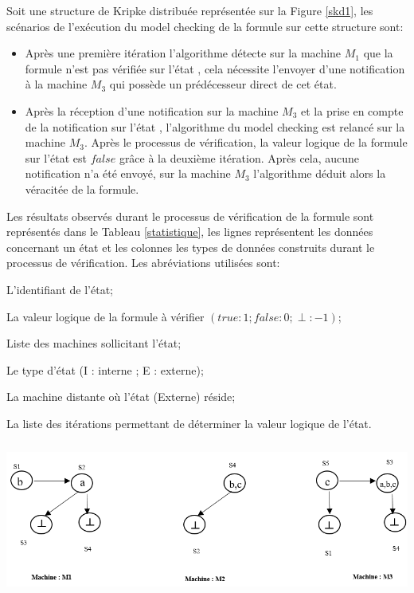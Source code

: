 \begin{Exemple}
   Soit une structure de Kripke distribuée représentée sur la Figure \ref{skd1}, les scénarios de l'exécution du model checking de la formule  sur cette structure sont:
   \begin{itemize}
   	\item Après une première itération l'algorithme détecte sur la machine $M_1$ que la formule n’est pas vérifiée sur l’état , cela nécessite l'envoyer d'une notification à la machine $M_3$ qui possède un prédécesseur direct de cet état.
   	\item Après la réception d'une notification sur la machine $M_3$ et la prise en compte de la notification sur l'état , l'algorithme du model checking est relancé sur la machine $M_3$. Après le processus de vérification, la valeur logique de la formule sur l’état  est $false$ grâce à la deuxième itération. Après cela, aucune notification n'a été envoyé, sur la machine $M_3$ l'algorithme déduit alors la véracitée de la formule.
   \end{itemize}    
Les résultats observés durant le processus de vérification de la formule  sont représentés dans le Tableau \ref{statistique}, les lignes représentent les données concernant un état et les colonnes les types de données construits durant le processus de vérification. Les abréviations utilisées sont:
\begin{description}[,leftmargin=2cm,labelindent=1em]
	\item[Id   :] L'identifiant de l’état;
	\item[VL   :] La valeur logique de la formule à vérifier $(true : 1 ; false : 0 ; \perp : -1)$;
	\item [Sub :] Liste des machines sollicitant l'état;
	\item[T    :] Le type d’état (I : interne ; E : externe);
	\item[Site :] La machine distante o\`{u} l'état (Externe) réside;
	\item[I    :] La liste des itérations permettant de déterminer la valeur logique de l'état.	
\end{description}
   \centering
	\includegraphics[height=2in]{img/skd1.png}	
	\label{skd1}
\end{Exemple}
